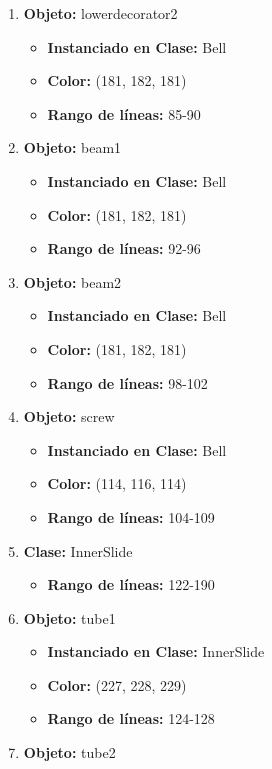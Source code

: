\documentclass[10pt, a4paper]{article}
\begin{document}
\begin{enumerate}
\begin{itemize}
	\end{itemize}
	\item \textbf{Objeto:} lowerdecorator2
	\begin{itemize}
		\item \textbf{Instanciado en Clase:} Bell
		\item \textbf{Color:} (181, 182, 181)
		\item \textbf{Rango de líneas:} 85-90
	\end{itemize}
	\item \textbf{Objeto:} beam1 
	\begin{itemize}
		\item \textbf{Instanciado en Clase:} Bell
		\item \textbf{Color:} (181, 182, 181)
		\item \textbf{Rango de líneas:} 92-96
	\end{itemize}
	\item \textbf{Objeto:} beam2
	\begin{itemize}
		\item \textbf{Instanciado en Clase:} Bell
		\item \textbf{Color:} (181, 182, 181)
		\item \textbf{Rango de líneas:} 98-102
	\end{itemize}
	\item \textbf{Objeto:} screw
	\begin{itemize}
		\item \textbf{Instanciado en Clase:} Bell
		\item \textbf{Color:} (114, 116, 114)
		\item \textbf{Rango de líneas:} 104-109
	\end{itemize}
	\item \textbf{Clase:} InnerSlide
	\begin{itemize}
		\item \textbf{Rango de líneas:} 122-190
	\end{itemize}
	\item \textbf{Objeto:} tube1
	\begin{itemize}
		\item \textbf{Instanciado en Clase:} InnerSlide
		\item \textbf{Color:} (227, 228, 229)
		\item \textbf{Rango de líneas:} 124-128
	\end{itemize}
	\item \textbf{Objeto:} tube2
	\begin{itemize}

\end{itemize}
\end{enumerate}
\end{document}
